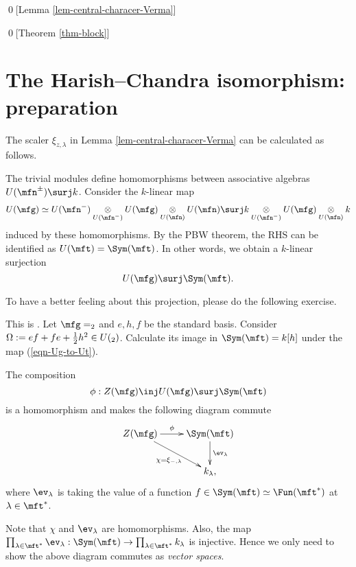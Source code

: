 \qed[Lemma \ref{lem-central-characer-Verma}]

\qed[Theorem \ref{thm-block}]

\section{The Harish--Chandra isomorphism: preparation}

The scaler $\xi_{z,\lambda}$ in Lemma \ref{lem-central-characer-Verma} can be calculated as follows.

\begin{constr}
	The trivial modules define homomorphisms between associative algebras $U(\mfn^\pm) \surj k$. Consider the $k$-linear map
	\[
		U(\mfg) \simeq U(\mfn^-) \ot_{U(\mfn^-)} U(\mfg) \ot_{U(\mfn)} U(\mfn) \surj k \ot_{U(\mfn^-)} U(\mfg) \ot_{U(\mfn)} k
	\]
	induced by these homomorphisms. By the PBW theorem, the RHS can be identified as $U(\mft)= \Sym(\mft)$. In other words, we obtain a $k$-linear surjection 
	\begin{equation} \label{eqn-Ug-to-Ut}
		U(\mfg) \surj \Sym(\mft).
	\end{equation}
\end{constr}

To have a better feeling about this projection, please do the following exercise.

\begin{exe} 
	This is . Let $\mfg=\sl_2$ and $e,h,f$ be the standard basis. Consider $\Omega:=ef+fe+\frac{1}{2}h^2\in U(\sl_2)$. Calculate its image in $\Sym(\mft)=k[h]$ under the map (\ref{eqn-Ug-to-Ut}).
\end{exe}

\begin{lem}
	\label{lem-HC-map}
	The composition 
	\[
		\phi:Z(\mfg) \inj U(\mfg) \surj \Sym(\mft)
	\]
	is a homomorphism and makes the following diagram commute
	\[
		\xymatrix{
			Z(\mfg) 
				\ar[r]^-\phi
				\ar[rd]_-{\chi=\xi_{-,\lambda}}
			& \Sym(\mft) \ar[d]^-{\ev_\lambda} \\
			& k_\lambda,
		}
	\]
	where $\ev_\lambda$ is taking the value of a function $f\in \Sym(\mft)\simeq \Fun(\mft^*)$ at $\lambda\in \mft^*$.
\end{lem}

\proof
	Note that $\chi$ and $\ev_\lambda$ are homomorphisms. Also, the map $\prod_{\lambda\in \mft^*} \ev_\lambda: \Sym(\mft) \to \prod_{\lambda\in \mft^*} k_\lambda$ is injective. Hence we only need to show the above diagram commutes as \emph{vector spaces}.

